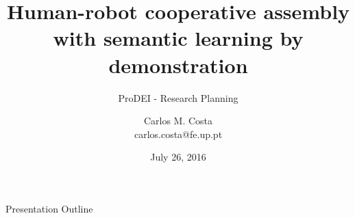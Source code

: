 





\title{Human-robot cooperative assembly with semantic learning by demonstration}
\subtitle{ProDEI - Research Planning}
\author{Carlos M. Costa\texorpdfstring{\\{\ttfamily carlos.costa@fe.up.pt}}{}}
\date{July 26, 2016}




\begin{frame}
	\titlepage
\end{frame}




\begin{frame}{Presentation Outline}
	\begingroup
	\footnotesize
	\tableofcontents
	\endgroup
\end{frame}














